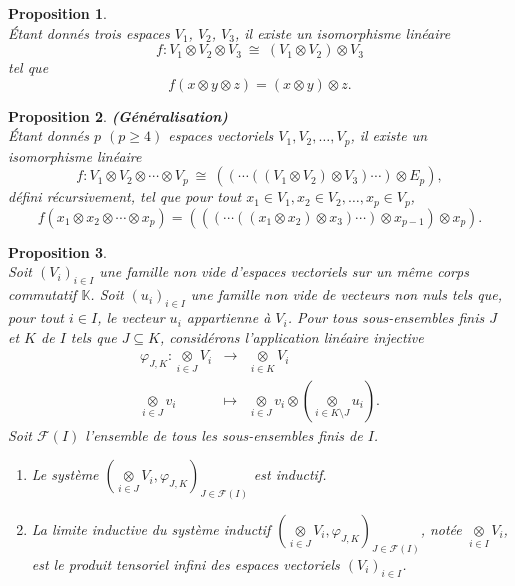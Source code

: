 \documentclass[a4paper, 14pt]{report}
\newtheorem{proposition}{Proposition}[section]
\begin{document}
\begin{onehalfspace}
{			\begin{proposition}\cite{greub2012linear}\\
Étant donnés trois espaces \(V_1\), \(V_2\), \(V_3\), il existe un isomorphisme linéaire  
				\[
				f : V_1 \otimes V_2 \otimes V_3 \ \cong \ (V_1 \otimes V_2) \otimes V_3
				\]
				tel que
				\[
				f(x \otimes y \otimes z) = (x \otimes y) \otimes z.
				\]
			\end{proposition}
			
			
			\begin{proposition}\textbf{(Généralisation)}  \cite{greub2012linear}\\
Étant donnés \(p\) \((p \geq 4)\) espaces vectoriels  \(V_1, V_2, \dots, V_p\), il existe un isomorphisme linéaire  
				\[
				f : V_1 \otimes V_2 \otimes \cdots \otimes V_p \ \cong \ ((\cdots((V_1 \otimes V_2) \otimes V_3) \cdots) \otimes E_p),
				\]
				défini récursivement, tel que pour tout \(x_1 \in V_1, x_2 \in V_2, \dots, x_p \in V_p\),
				\[
				f(x_1 \otimes x_2 \otimes \cdots \otimes x_p) = (((\cdots((x_1 \otimes x_2) \otimes x_3) \cdots) \otimes x_{p-1}) \otimes x_p).
				\]
			\end{proposition}
			
			
			
			\begin{proposition} \cite{Guichardet} \\
Soit $(V_i)_{i\in I}$ une famille non vide d’espaces vectoriels sur un même corps commutatif  $\mathbb{K}$. Soit $(u_i)_{i\in I}$ une famille non vide de vecteurs non nuls tels que, pour tout $i\in I$, le vecteur $u_i$ appartienne à $V_i$. Pour tous sous-ensembles finis $J$ et $K$ de $I$ tels que $J\subseteq K$, considérons l'application linéaire injective  
				$$\begin{array}{rlll}
					\varphi_{J,K}: \underset{i\in J}\otimes V_i& \longrightarrow& \underset{i\in K}\otimes V_i\\
					\underset{i\in J}\otimes v_i&\longmapsto& \underset{i\in J}\otimes v_i\otimes(\underset{i\in K\setminus J}\otimes u_i).
				\end{array}
				$$
				Soit $\mathcal{F}(I)$ l'ensemble de tous les sous-ensembles finis de $I$. 
				\begin{enumerate}[label=\roman*)]
					\item Le système $(\underset{i\in J}\otimes V_i, \varphi_{J,K})_{J\in \mathcal{F}(I)}$ est inductif.
					\item La limite inductive du système inductif $(\underset{i\in J}\otimes V_i, \varphi_{J,K})_{J\in \mathcal{F}(I)}$, notée $\underset{i\in I}\otimes V_i$, est le produit tensoriel infini des espaces vectoriels $(V_i)_{i\in I}$.
				\end{enumerate}
			\end{proposition}
			
}
\end{onehalfspace}
\end{document}
